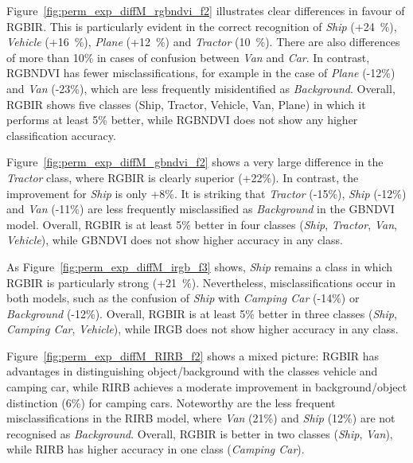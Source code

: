 Figure~\ref{fig:perm_exp_diffM_rgbndvi_f2} illustrates clear differences in favour of RGBIR. This is particularly evident in the correct recognition of \textit{Ship} (+24~\%), \textit{Vehicle} (+16~\%), \textit{Plane} (+12~\%) and \textit{Tractor} (10~\%). There are also differences of more than 10\% in cases of confusion between \textit{Van} and \textit{Car}. In contrast, RGBNDVI has fewer misclassifications, for example in the case of \textit{Plane} (-12\%) and \textit{Van} (-23\%), which are less frequently misidentified as \textit{Background}. Overall, RGBIR shows five classes (Ship, Tractor, Vehicle, Van, Plane) in which it performs at least 5\% better, while RGBNDVI does not show any higher classification accuracy.


Figure~\ref{fig:perm_exp_diffM_gbndvi_f2} shows a very large difference in the \textit{Tractor} class, where RGBIR is clearly superior (+22\%). In contrast, the improvement for \textit{Ship} is only +8\%. It is striking that \textit{Tractor} (-15\%), \textit{Ship} (-12\%) and \textit{Van} (-11\%) are less frequently misclassified as \textit{Background} in the GBNDVI model. Overall, RGBIR is at least 5\% better in four classes (\textit{Ship}, \textit{Tractor}, \textit{Van}, \textit{Vehicle}), while GBNDVI does not show higher accuracy in any class.




As Figure~\ref{fig:perm_exp_diffM_irgb_f3} shows, \textit{Ship} remains a class in which RGBIR is particularly strong (+21~\%). Nevertheless, misclassifications occur in both models, such as the confusion of \textit{Ship} with \textit{Camping Car} (-14\%) or \textit {Background} (-12\%). Overall, RGBIR is at least 5\% better in three classes (\textit{Ship}, \textit{Camping Car}, \textit{Vehicle}), while IRGB does not show higher accuracy in any class.




Figure~\ref{fig:perm_exp_diffM_RIRB_f2} shows a mixed picture: RGBIR has advantages in distinguishing object/background with the classes vehicle and camping car, while RIRB achieves a moderate improvement in background/object distinction (6\%) for camping cars. Noteworthy are the less frequent misclassifications in the RIRB model, where \textit{Van} (21\%) and \textit{Ship} (12\%) are not recognised as \textit{Background}. Overall, RGBIR is better in two classes (\textit{Ship}, \textit{Van}), while RIRB has higher accuracy in one class (\textit{Camping Car}).




